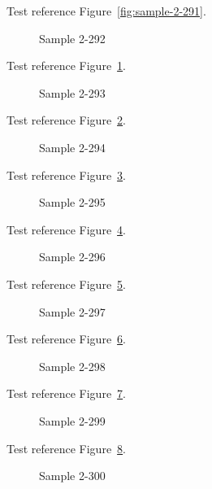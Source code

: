 Test reference Figure~\ref{fig:sample-2-291}.

\begin{figure}[tbhp]
\caption{Sample 2-292}
\label{fig:sample-2-292}
\end{figure}

Test reference Figure~\ref{fig:sample-2-292}.

\begin{figure}[tbhp]
\caption{Sample 2-293}
\label{fig:sample-2-293}
\end{figure}

Test reference Figure~\ref{fig:sample-2-293}.

\begin{figure}[tbhp]
\caption{Sample 2-294}
\label{fig:sample-2-294}
\end{figure}

Test reference Figure~\ref{fig:sample-2-294}.

\begin{figure}[tbhp]
\caption{Sample 2-295}
\label{fig:sample-2-295}
\end{figure}

Test reference Figure~\ref{fig:sample-2-295}.

\begin{figure}[tbhp]
\caption{Sample 2-296}
\label{fig:sample-2-296}
\end{figure}

Test reference Figure~\ref{fig:sample-2-296}.

\begin{figure}[tbhp]
\caption{Sample 2-297}
\label{fig:sample-2-297}
\end{figure}

Test reference Figure~\ref{fig:sample-2-297}.

\begin{figure}[tbhp]
\caption{Sample 2-298}
\label{fig:sample-2-298}
\end{figure}

Test reference Figure~\ref{fig:sample-2-298}.

\begin{figure}[tbhp]
\caption{Sample 2-299}
\label{fig:sample-2-299}
\end{figure}

Test reference Figure~\ref{fig:sample-2-299}.

\begin{figure}[tbhp]
\caption{Sample 2-300}
\label{fig:sample-2-300}
\end{figure}

